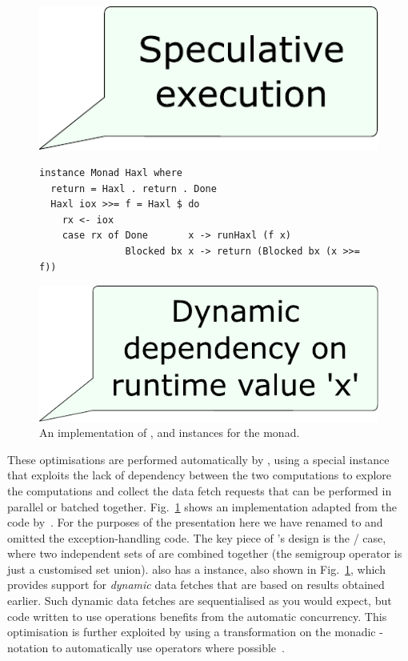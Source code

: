 \begin{figure}
\vspace{11.5mm}\hspace{110.5mm}\includegraphics[scale=0.32]{fig/comment-haxl-selective-2.pdf}
\vspace{-7.5mm}
\begin{verbatim}
instance Monad Haxl where
  return = Haxl . return . Done
  Haxl iox >>= f = Haxl $ do
    rx <- iox
    case rx of Done       x -> runHaxl (f x)
               Blocked bx x -> return (Blocked bx (x >>= f))
\end{verbatim}
\vspace{-19mm}\hspace{31mm}\includegraphics[scale=0.32]{fig/comment-haxl-monad.pdf}
\vspace{5mm}
\caption{An implementation of ,  and 
instances for the \Haxl monad.}
\label{fig-haxl}
\vspace{-3mm}
\end{figure}

These optimisations are performed automatically by \Haxl, using a
special  instance that exploits the lack of
dependency between the two computations to explore the computations
and collect the data fetch requests that can be performed in parallel or batched
together. Fig.~\ref{fig-haxl} shows an implementation adapted from the code
by~\citet{marlow2014haxl}. For the purposes of the presentation here we have
renamed  to  and omitted the exception-handling code.
The key piece of \Haxl's design is the / case, where
two independent sets of  are combined together (the
semigroup operator \hs{<>} is just a customised set union). \Haxl also has a
 instance, also shown in Fig.~\ref{fig-haxl}, which provides support
for \emph{dynamic} data fetches that are based on results obtained earlier.
Such dynamic data fetches are sequentialised as you would expect, but code
written to use  operations benefits from the automatic
concurrency. This optimisation is further exploited by using a transformation
on the monadic -notation to automatically use 
operators where possible~\cite{marlow2016applicativedo}.

